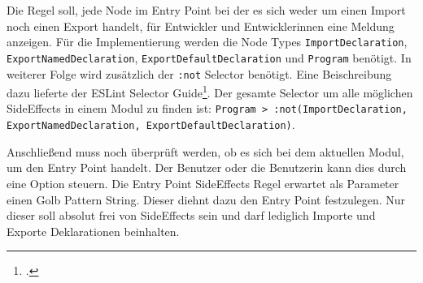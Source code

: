Die Regel soll, jede Node im Entry Point bei der es sich weder um einen Import noch einen Export handelt, für Entwickler  und Entwicklerinnen eine Meldung anzeigen. Für die Implementierung werden die Node Types \lstinline{ImportDeclaration}, \lstinline{ExportNamedDeclaration}, \lstinline{ExportDefaultDeclaration} und \lstinline{Program} benötigt. In weiterer Folge wird zusätzlich der \lstinline{:not} Selector benötigt. Eine Beischreibung dazu lieferte der ESLint Selector Guide\footcite{https://eslint.org/docs/developer-guide/selectors - besucht am 29.06.2018}. Der gesamte Selector um alle möglichen SideEffects in einem Modul zu finden ist: \lstinline{Program > :not(ImportDeclaration, ExportNamedDeclaration, ExportDefaultDeclaration)}.

Anschließend muss noch überprüft werden, ob es sich bei dem aktuellen Modul, um den Entry Point handelt. Der Benutzer oder die Benutzerin kann dies durch eine Option steuern. Die Entry Point SideEffects Regel erwartet als Parameter einen Golb Pattern String. Dieser diehnt dazu den Entry Point festzulegen. Nur dieser soll absolut frei von SideEffects sein und darf lediglich Importe und Exporte Deklarationen beinhalten.
